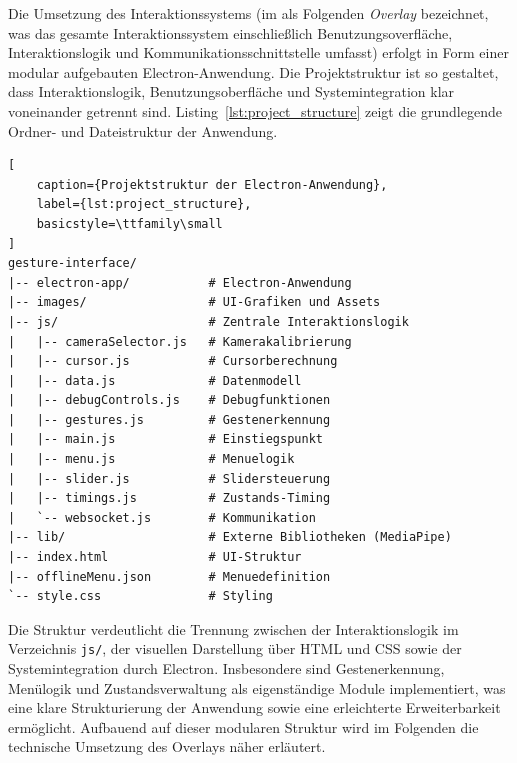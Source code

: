 Die Umsetzung des Interaktionssystems (im als Folgenden \textit{Overlay} bezeichnet, was das gesamte Interaktionssystem einschließlich Benutzungsoverfläche, Interaktionslogik und Kommunikationsschnittstelle umfasst) erfolgt in Form einer modular aufgebauten Electron-Anwendung.
Die Projektstruktur ist so gestaltet, dass Interaktionslogik, Benutzungsoberfläche und Systemintegration klar voneinander getrennt sind.
Listing~\ref{lst:project_structure} zeigt die grundlegende Ordner- und Dateistruktur der Anwendung.
\begin{lstlisting}[
    caption={Projektstruktur der Electron-Anwendung},
    label={lst:project_structure},
    basicstyle=\ttfamily\small
]
gesture-interface/
|-- electron-app/           # Electron-Anwendung
|-- images/                 # UI-Grafiken und Assets
|-- js/                     # Zentrale Interaktionslogik
|   |-- cameraSelector.js   # Kamerakalibrierung
|   |-- cursor.js           # Cursorberechnung
|   |-- data.js             # Datenmodell
|   |-- debugControls.js    # Debugfunktionen
|   |-- gestures.js         # Gestenerkennung
|   |-- main.js             # Einstiegspunkt
|   |-- menu.js             # Menuelogik
|   |-- slider.js           # Slidersteuerung
|   |-- timings.js          # Zustands-Timing
|   `-- websocket.js        # Kommunikation
|-- lib/                    # Externe Bibliotheken (MediaPipe)
|-- index.html              # UI-Struktur
|-- offlineMenu.json        # Menuedefinition
`-- style.css               # Styling
\end{lstlisting}

Die Struktur verdeutlicht die Trennung zwischen der Interaktionslogik im Verzeichnis \texttt{js/},
der visuellen Darstellung über HTML und CSS sowie der Systemintegration durch Electron.
Insbesondere sind Gestenerkennung, Menülogik und Zustandsverwaltung als eigenständige Module implementiert,
was eine klare Strukturierung der Anwendung sowie eine erleichterte Erweiterbarkeit ermöglicht.
Aufbauend auf dieser modularen Struktur wird im Folgenden die technische Umsetzung des Overlays näher erläutert.


